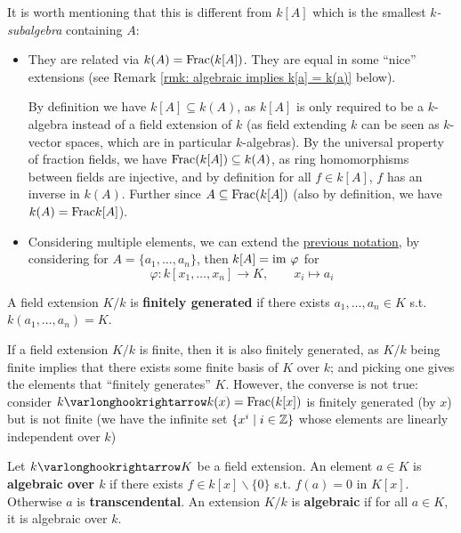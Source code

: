 \documentclass{article}
\begin{document}
\begin{remark}
    It is worth mentioning that this is different from $k[A]$ which is the smallest \emph{$k$-subalgebra} containing $A$:
    \begin{itemize}
        \item They are related via $k(A) = \mathrm{Frac}(k[A])$. They are equal in some ``nice'' extensions (see Remark \ref{rmk: algebraic implies k[a] = k(a)} below).
        
        By definition we have $k[A] \subseteq k(A)$, as $k[A]$ is only required to be a $k$-algebra instead of a field extension of $k$ (as field extending $k$ can be seen as $k$-vector spaces, which are in particular $k$-algebras). By the universal property of fraction fields, we have $\mathrm{Frac}(k[A]) \subseteq k(A)$, as ring homomorphisms between fields are injective, and by definition for all $f \in k[A]$, $f$ has an inverse in $k(A)$. Further since $A \subseteq \mathrm{Frac}(k[A])$ (also by definition, we have $k(A) = \mathrm{Frac}{k[A]}$).
        \item Considering multiple elements, we can extend the \hyperref[not: extending field by algebra]{previous notation}, by considering for $A = \{a_1, \dots, a_n\}$, then $k[A] = \mathrm{im}\  \varphi$ for
        \[
            \varphi: k[x_1, \dots, x_n] \to K, \qquad x_i \mapsto a_i
        \]
    \end{itemize}
\end{remark}

\begin{definition}
    A field extension $K/k$ is \textbf{finitely generated} if there exists $a_1, \dots, a_n \in K$ s.t. \newline $k(a_1, \dots, a_n) = K$.
\end{definition}

\begin{remark}
    If a field extension $K/k$ is finite, then it is also finitely generated, as $K/k$ being finite implies that there exists some finite basis of $K$ over $k$; and picking one gives the elements that ``finitely generates'' $K$. However, the converse is not true: consider $k \ext k(x) = \Frac(k[x])$ is finitely generated (by $x$) but is not finite (we have the infinite set $\{ x^i \mid i \in \mathbb{Z} \}$ whose elements are linearly independent over $k$)
\end{remark}

\begin{definition}
    Let $k \ext K$ be a field extension. An element $a \in K$ is \textbf{algebraic over $k$} if there exists $f \in k[x] \smallsetminus \{0\}$ s.t. $f(a) = 0$ in $K[x]$. Otherwise $a$ is \textbf{transcendental}. An extension $K/k$ is \textbf{algebraic} if for all $a \in K$, it is algebraic over $k$.
\end{definition}
\end{document}
